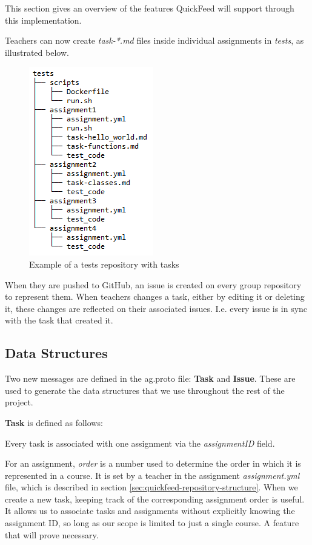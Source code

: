 This section gives an overview of the features QuickFeed will support through this implementation.

Teachers can now create \textit{task-*.md} files inside individual assignments in \textit{tests}, as illustrated below.

\begin{figure}[ht]
    \centering
    \includegraphics[scale=0.8]{photos/tests-repository-structure-tasks.PNG}
    \caption{Example of a tests repository with tasks}
    \label{fig:tests-repository-structure-tasks}
\end{figure}

When they are pushed to GitHub, an issue is created on every group repository to represent them.
When teachers changes a task, either by editing it or deleting it, these changes are reflected on their associated issues.
I.e. every issue is in sync with the task that created it.

\subsection{Data Structures}

Two new messages are defined in the ag.proto file: \textbf{Task} and \textbf{Issue}.
These are used to generate the data structures that we use throughout the rest of the project.

\textbf{Task} is defined as follows:



Every task is associated with one assignment via the \textit{assignmentID} field.

For an assignment, \textit{order} is a number used to determine the order in which it is represented in a course.
It is set by a teacher in the assignment \textit{assignment.yml} file, which is described in section \ref{sec:quickfeed-repository-structure}.
When we create a new task, keeping track of the corresponding assignment order is useful.
It allows us to associate tasks and assignments without explicitly knowing the assignment ID, so long as our scope is limited to just a single course.
A feature that will prove necessary.

